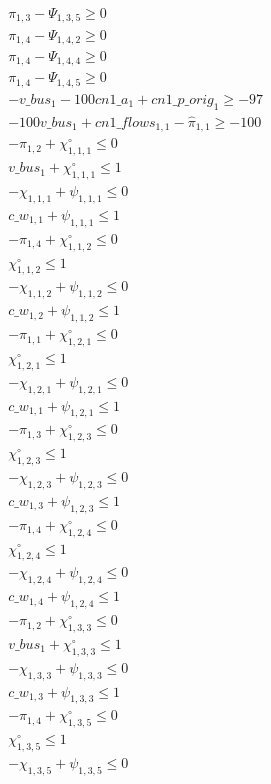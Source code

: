 \documentclass[]{article}
\begin{document}
\begin{align*}
 & \pi_{1,3} - \Psi_{1,3,5} \geq 0\\
 & \pi_{1,4} - \Psi_{1,4,2} \geq 0\\
 & \pi_{1,4} - \Psi_{1,4,4} \geq 0\\
 & \pi_{1,4} - \Psi_{1,4,5} \geq 0\\
 & -v\_bus_{1} - 100 cn1\_a_{1} + cn1\_p\_orig_{1} \geq -97\\
 & -100 v\_bus_{1} + cn1\_flows_{1,1} - \hat{\pi} _{1,1} \geq -100\\
 & -\pi_{1,2} + \chi^\circ_{1,1,1} \leq 0\\
 & v\_bus_{1} + \chi^\circ_{1,1,1} \leq 1\\
 & -\chi_{1,1,1} + \psi_{1,1,1} \leq 0\\
 & c\_w_{1,1} + \psi_{1,1,1} \leq 1\\
 & -\pi_{1,4} + \chi^\circ_{1,1,2} \leq 0\\
 & \chi^\circ_{1,1,2} \leq 1\\
 & -\chi_{1,1,2} + \psi_{1,1,2} \leq 0\\
 & c\_w_{1,2} + \psi_{1,1,2} \leq 1\\
 & -\pi_{1,1} + \chi^\circ_{1,2,1} \leq 0\\
 & \chi^\circ_{1,2,1} \leq 1\\
 & -\chi_{1,2,1} + \psi_{1,2,1} \leq 0\\
 & c\_w_{1,1} + \psi_{1,2,1} \leq 1\\
 & -\pi_{1,3} + \chi^\circ_{1,2,3} \leq 0\\
 & \chi^\circ_{1,2,3} \leq 1\\
 & -\chi_{1,2,3} + \psi_{1,2,3} \leq 0\\
 & c\_w_{1,3} + \psi_{1,2,3} \leq 1\\
 & -\pi_{1,4} + \chi^\circ_{1,2,4} \leq 0\\
 & \chi^\circ_{1,2,4} \leq 1\\
 & -\chi_{1,2,4} + \psi_{1,2,4} \leq 0\\
 & c\_w_{1,4} + \psi_{1,2,4} \leq 1\\
 & -\pi_{1,2} + \chi^\circ_{1,3,3} \leq 0\\
 & v\_bus_{1} + \chi^\circ_{1,3,3} \leq 1\\
 & -\chi_{1,3,3} + \psi_{1,3,3} \leq 0\\
 & c\_w_{1,3} + \psi_{1,3,3} \leq 1\\
 & -\pi_{1,4} + \chi^\circ_{1,3,5} \leq 0\\
 & \chi^\circ_{1,3,5} \leq 1\\
 & -\chi_{1,3,5} + \psi_{1,3,5} \leq 0\\

\end{align*}
\end{document}
